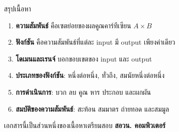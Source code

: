 \documentclass[11pt, aspectratio=169]{beamer}
\begin{document}
\begin{frame}{สรุปเนื้อหา}
  \begin{explanation}[สิ่งที่ได้เรียนรู้]
    \begin{enumerate}
      \item \textbf{ความสัมพันธ์} คือเซตย่อยของผลคูณคาร์ทีเซียน $A \times B$
      \item \textbf{ฟังก์ชัน} คือความสัมพันธ์ที่แต่ละ input มี output เพียงค่าเดียว
      \item \textbf{โดเมนและเรนจ์} บอกขอบเขตของ input และ output
      \item \textbf{ประเภทของฟังก์ชัน}: หนึ่งต่อหนึ่ง, ทั่วถึง, สมนัยหนึ่งต่อหนึ่ง
      \item \textbf{การดำเนินการ}: บวก ลบ คูณ หาร ประกอบ และผกผัน
      \item \textbf{สมบัติของความสัมพันธ์}: สะท้อน สมมาตร ถ่ายทอด และสมมูล
    \end{enumerate}
  \end{explanation}

  \begin{center}
    \large เอกสารนี้เป็นส่วนหนึ่งของเนื้อหาเตรียมสอบ \textbf{สอวน. คอมพิวเตอร์}
  \end{center}
\end{frame}
\end{document}
